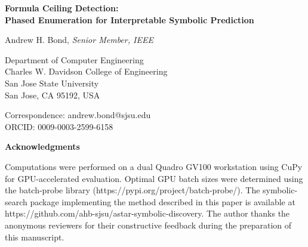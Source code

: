 \documentclass[12pt]{article}
\begin{document}
\thispagestyle{empty}

\begin{center}
{\LARGE\bfseries Formula Ceiling Detection:\\
Phased Enumeration for Interpretable Symbolic Prediction}

\vspace{24pt}

{\large Andrew H. Bond, \textit{Senior Member, IEEE}}

\vspace{12pt}

Department of Computer Engineering\\
Charles W. Davidson College of Engineering\\
San Jose State University\\
San Jose, CA 95192, USA

\vspace{12pt}

Correspondence: andrew.bond@sjsu.edu\\
ORCID: 0009-0003-2599-6158

\vspace{36pt}

\textbf{Acknowledgments}

\vspace{6pt}

Computations were performed on a dual Quadro GV100 workstation
using CuPy for GPU-accelerated evaluation. Optimal GPU batch sizes
were determined using the batch-probe library
(https://pypi.org/project/batch-probe/).
The symbolic-search package implementing the method described in
this paper is available at
https://github.com/ahb-sjsu/astar-symbolic-discovery.
The author thanks the anonymous reviewers for their constructive
feedback during the preparation of this manuscript.

\end{center}
\end{document}
